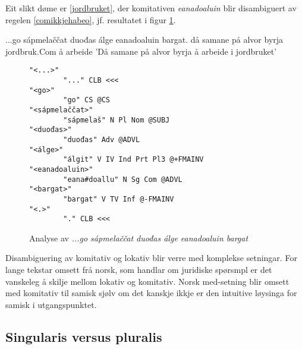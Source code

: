 \documentclass[a4paper,nynorsk]{article}
\begin{document}
Eit slikt døme er \ref{jordbruket}, der komitativen \emph{eanadoaluin} blir disambiguert av regelen \ref{comikkjehabeo}, jf. resultatet i figur \ref{comverbana}.%

\begin{example}\label{jordbruket}
\gll ...go sápmelaččat duođas álge eanadoaluin bargat.
     då samane {på alvor} byrja jordbruk.Com {å arbeide}
\glt 'Då samane på alvor byrja å arbeide i jordbruket'
\glend     
\end{example}

\begin{figure}[htbp]
\begin{center}
\begin{verbatim}
"<...>"
        "..." CLB <<<
"<go>"
        "go" CS @CS
"<sápmelaččat>"
        "sápmelaš" N Pl Nom @SUBJ
"<duođas>"
        "duođas" Adv @ADVL
"<álge>"
        "álgit" V IV Ind Prt Pl3 @+FMAINV
"<eanadoaluin>"
        "eana#doallu" N Sg Com @ADVL
"<bargat>"
        "bargat" V TV Inf @-FMAINV
"<.>"
        "." CLB <<<
\end{verbatim}
\caption{Analyse av \textit{...go sápmelaččat duođas álge eanadoaluin bargat}}
\label{comverbana}
\end{center}
\end{figure}



Disambiguering av komitativ og lokativ blir verre med komplekse setningar. For lange tekstar omsett frå norsk, som handlar om juridiske spørsmpl er det vanskeleg å skilje mellom lokativ og komitativ. Norsk med-setning blir omsett med komitativ til samisk sjølv om det kanskje ikkje er den intuitive løysinga for samisk i utgangspunktet. %




\subsection{Singularis versus pluralis}
\end{document}
